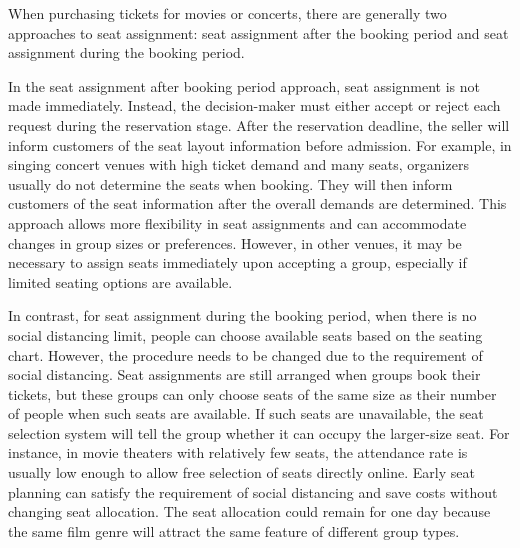 

When purchasing tickets for movies or concerts, there are generally two approaches to seat assignment: seat assignment after the booking period and seat assignment during the booking period.

In the seat assignment after booking period approach, seat assignment is not made immediately. Instead, the decision-maker must either accept or reject each request during the reservation stage. After the reservation deadline, the seller will inform customers of the seat layout information before admission. For example, in singing concert venues with high ticket demand and many seats, organizers usually do not determine the seats when booking. They will then inform customers of the seat information after the overall demands are determined. This approach allows more flexibility in seat assignments and can accommodate changes in group sizes or preferences. However, in other venues, it may be necessary to assign seats immediately upon accepting a group, especially if limited seating options are available.

In contrast, for seat assignment during the booking period, when there is no social distancing limit, people can choose available seats based on the seating chart. However, the procedure needs to be changed due to the requirement of social distancing. Seat assignments are still arranged when groups book their tickets, but these groups can only choose seats of the same size as their number of people when such seats are available. If such seats are unavailable, the seat selection system will tell the group whether it can occupy the larger-size seat. For instance, in movie theaters with relatively few seats, the attendance rate is usually low enough to allow free selection of seats directly online. Early seat planning can satisfy the requirement of social distancing and save costs without changing seat allocation. The seat allocation could remain for one day because the same film genre will attract the same feature of different group types.






